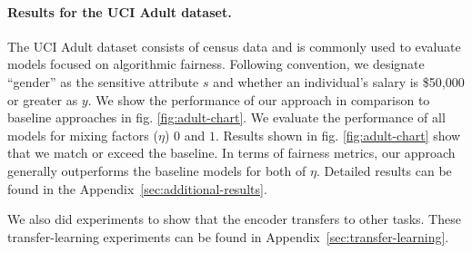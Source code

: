 \paragraph{Results for the UCI Adult dataset.}
The UCI Adult dataset consists of census data and is commonly used to evaluate models focused on algorithmic fairness.
Following convention, we designate ``gender'' as the sensitive attribute $s$ and whether an individual's salary is \$50,000 or greater as $y$.
We show the performance of our approach in comparison to baseline approaches in fig. \ref{fig:adult-chart}.
We evaluate the performance of all models for mixing factors ($\eta$) $0$ and $1$. 
Results shown in fig. \ref{fig:adult-chart} show that
we match or exceed the baseline.
In terms of fairness metrics, our approach generally outperforms the baseline models for both of $\eta$.
Detailed results can be found in the Appendix~\ref{sec:additional-results}.

We also did experiments to show that the encoder transfers to other tasks. These transfer-learning experiments can be found in Appendix~\ref{sec:transfer-learning}.


